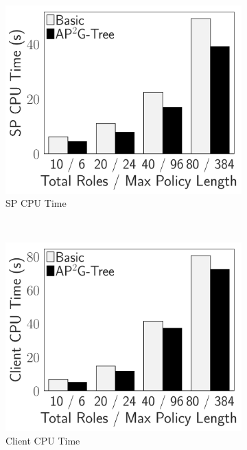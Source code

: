 \begin{figure}[t]
    \centering
    \begin{subfigure}{.33\linewidth}
        \includegraphics[width=\linewidth]{exp-figs/access-control/policy_2_sp.pdf}
        \caption{SP CPU Time}
    \end{subfigure}~%
    \begin{subfigure}{.33\linewidth}
        \includegraphics[width=\linewidth]{exp-figs/access-control/policy_2_user.pdf}
        \caption{Client CPU Time}
    \end{subfigure}~%
    \begin{subfigure}{.33\linewidth}

\end{subfigure}
\end{figure}
